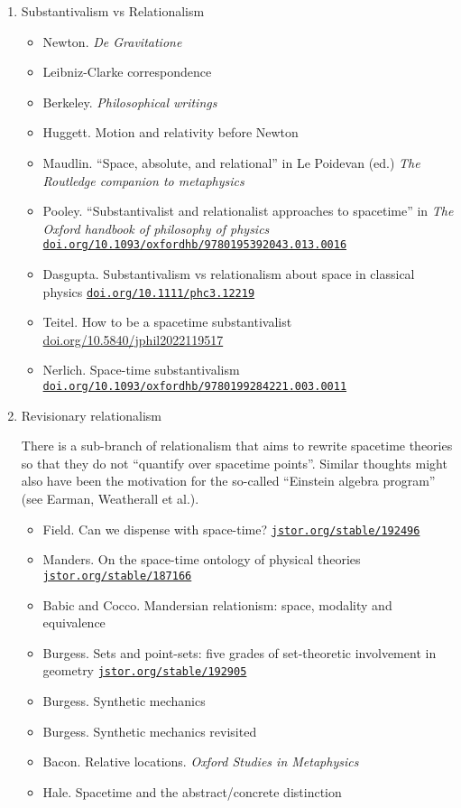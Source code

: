\documentclass[11pt]{article}
\newcommand\rurl[1]{%
  \href{http://#1}{\nolinkurl{#1}}%
}
\begin{document}
\begin{enumerate}
\item Substantivalism vs Relationalism
  \begin{itemize}
  \item Newton. \textit{De Gravitatione}
  \item Leibniz-Clarke correspondence
  \item Berkeley. \textit{Philosophical writings}
  \item Huggett. Motion and relativity before Newton
  \item Maudlin. ``Space, absolute, and relational'' in Le Poidevan
    (ed.) \textit{The Routledge companion to metaphysics}
  \item Pooley. ``Substantivalist and relationalist approaches to
    spacetime'' in \textit{The Oxford handbook of philosophy of
      physics} \rurl{doi.org/10.1093/oxfordhb/9780195392043.013.0016}
  \item Dasgupta. Substantivalism vs relationalism about space in
    classical physics \rurl{doi.org/10.1111/phc3.12219}
  \item Teitel. How to be a spacetime substantivalist
    \url{doi.org/10.5840/jphil2022119517}
  \item Nerlich. Space-time substantivalism
    \rurl{doi.org/10.1093/oxfordhb/9780199284221.003.0011}
  \end{itemize}

\item Revisionary relationalism

  There is a sub-branch of relationalism that aims to rewrite
  spacetime theories so that they do not ``quantify over spacetime
  points''. Similar thoughts might also have been the motivation for
  the so-called ``Einstein algebra program'' (see Earman, Weatherall
  et al.).

  \begin{itemize}
  \item Field. Can we dispense with space-time?
    \rurl{jstor.org/stable/192496}
  \item Manders. On the space-time ontology of physical theories
    \rurl{jstor.org/stable/187166}
  \item Babic and Cocco. Mandersian relationism: space, modality and
    equivalence     
  \item Burgess. Sets and point-sets: five grades of set-theoretic
    involvement in geometry \rurl{jstor.org/stable/192905}
  \item Burgess. Synthetic mechanics 
  \item Burgess. Synthetic mechanics revisited
  \item Bacon. Relative locations. \textit{Oxford Studies in
      Metaphysics}
  \item Hale. Spacetime and the abstract/concrete distinction
  \end{itemize}


\end{enumerate}
\end{document}
